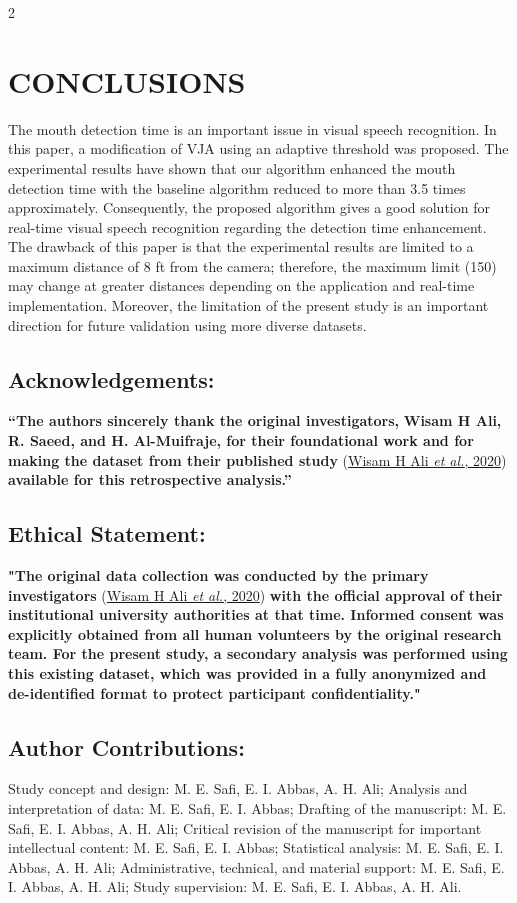 \documentclass[9pt]{extarticle}
\begin{document}
\begin{multicols}{2}
\section{CONCLUSIONS}
The mouth detection time is an important issue in visual speech recognition. In this paper, a modification of VJA using an adaptive threshold was proposed. The experimental results have shown that our algorithm enhanced the mouth detection time with the baseline algorithm reduced to more than 3.5 times approximately. Consequently, the proposed algorithm gives a good solution for real-time visual speech recognition regarding the detection time enhancement. The drawback of this paper is that the experimental results are limited to a maximum distance of 8 ft from the camera; therefore, the maximum limit (150) may change at greater distances depending on the application and real-time implementation. Moreover, the limitation of the present study is an important direction for future validation using more diverse datasets.

\subsection*{Acknowledgements:}
\textbf{“The authors sincerely thank the original investigators,} \textbf{Wisam H Ali, R. Saeed, and H. Al-Muifraje, for their foundational work and for making the dataset from their published study} (\hyperlink{ref:1}{Wisam H Ali \textit{et al.}, 2020}) \textbf{available for this retrospective analysis.”}

\subsection*{Ethical Statement:}
\textbf{"The original data collection was conducted by the primary investigators} (\hyperlink{ref:1}{Wisam H Ali \textit{et al.}, 2020}) \textbf{with the official approval of their institutional university authorities at that time. Informed consent was explicitly obtained from all human volunteers by the original research team. For the present study, a secondary analysis was performed using this existing dataset, which was provided in a fully anonymized and de-identified format to protect participant confidentiality."}

\subsection*{Author Contributions:}
\noindent Study concept and design: M. E. Safi, E. I. Abbas, A. H. Ali; Analysis and interpretation of data: M. E. Safi, E. I. Abbas; Drafting of the manuscript: M. E. Safi, E. I. Abbas, A. H. Ali; Critical revision of the manuscript for important intellectual content: M. E. Safi, E. I. Abbas; Statistical analysis: M. E. Safi, E. I. Abbas, A. H. Ali; Administrative, technical, and material support: M. E. Safi, E. I. Abbas, A. H. Ali; Study supervision: M. E. Safi, E. I. Abbas, A. H. Ali.


\end{multicols}
\end{document}
